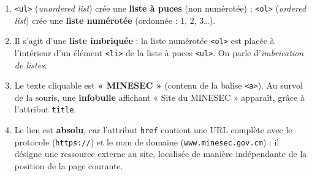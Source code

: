 \documentclass[11pt]{article}
\begin{document}
\begin{corrige}
\begin{enumerate}
\item \texttt{<ul>} (\emph{unordered list}) crée une \textbf{liste à puces} (non numérotée) ; \texttt{<ol>} (\emph{ordered list}) crée une \textbf{liste numérotée} (ordonnée : 1, 2, 3\ldots).
\item Il s'agit d'une \textbf{liste imbriquée} : la liste numérotée \texttt{<ol>} est placée à l'intérieur d'un élément \texttt{<li>} de la liste à puces \texttt{<ul>}. On parle d'\emph{imbrication de listes}.
\item Le texte cliquable est \textbf{« MINESEC »} (contenu de la balise \texttt{<a>}). Au survol de la souris, une \textbf{infobulle} affichant « Site du MINESEC » apparaît, grâce à l'attribut \texttt{title}.
\item Le lien est \textbf{absolu}, car l'attribut \texttt{href} contient une URL complète avec le protocole (\texttt{https://}) et le nom de domaine (\texttt{www.minesec.gov.cm}) : il désigne une ressource externe au site, localisée de manière indépendante de la position de la page courante.
\end{enumerate}
\end{corrige}
\end{document}
